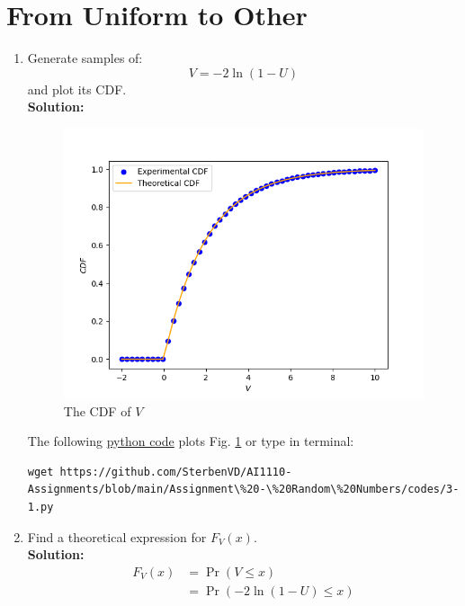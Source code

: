 \documentclass[journal,12pt,onecolumn]{IEEEtran}
\numberwithin{equation}{section}
\renewcommand\thesection{\arabic{section}}
\providecommand{\pr}[1]{\ensuremath{\Pr\left(#1\right)}}
\providecommand{\brak}[1]{\ensuremath{\left(#1\right)}}
\providecommand{\gitlink}[2]{{\color{blue}\href{https://github.com/SterbenVD/AI1110-Assignments/blob/main/Assignment\%20-\%20Random\%20Numbers/#1}{#2}}}
\newcommand{\solution}{\noindent \textbf{Solution: }}
\begin{document}
\section{From Uniform to Other}
\begin{enumerate}[label=\thesection.\arabic*,ref=\thesection.\theenumi]
    \item
          Generate samples of:
          \begin{equation}
              V = -2\ln\brak{1-U}
          \end{equation}
          and plot its CDF.
          \\
          \solution
          \begin{figure}[H]
              \centering
              \includegraphics[scale = 0.6]{../figs/3_cdf}
              \caption{The CDF of $V$}
              \label{fig:3_cdf}
          \end{figure}
          The following \gitlink{codes/3-1.py}{python code} plots Fig. \ref{fig:3_cdf} or type in terminal:
          \begin{lstlisting}
wget https://github.com/SterbenVD/AI1110-Assignments/blob/main/Assignment\%20-\%20Random\%20Numbers/codes/3-1.py
            \end{lstlisting}
    \item Find a theoretical expression for $F_V(x)$.
          \\
          \solution
          \begin{align}
              F_V(x) & = \pr{V \leq x}
              \\
                     & = \pr{-2\ln(1-U) \leq x}

\end{align}
\end{enumerate}
\end{document}

